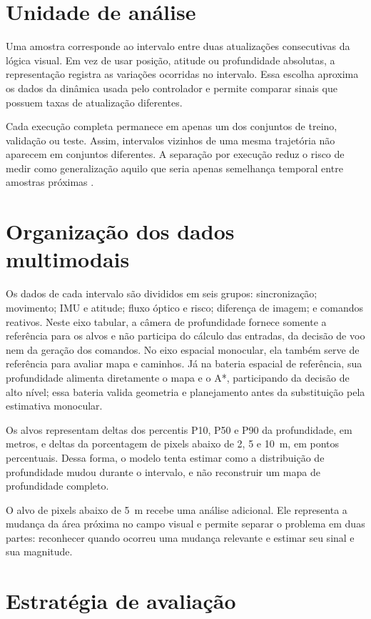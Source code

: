 \section{Unidade de análise}

Uma amostra corresponde ao intervalo entre duas atualizações consecutivas da lógica visual. Em vez de usar posição, atitude ou profundidade absolutas, a representação registra as variações ocorridas no intervalo. Essa escolha aproxima os dados da dinâmica usada pelo controlador e permite comparar sinais que possuem taxas de atualização diferentes.

Cada execução completa permanece em apenas um dos conjuntos de treino, validação ou teste. Assim, intervalos vizinhos de uma mesma trajetória não aparecem em conjuntos diferentes. A separação por execução reduz o risco de medir como generalização aquilo que seria apenas semelhança temporal entre amostras próximas \cite{Kapoor2023}.

\section{Organização dos dados multimodais}

Os dados de cada intervalo são divididos em seis grupos: sincronização; movimento; IMU e atitude; fluxo óptico e risco; diferença de imagem; e comandos reativos. Neste eixo tabular, a câmera de profundidade fornece somente a referência para os alvos e não participa do cálculo das entradas, da decisão de voo nem da geração dos comandos. No eixo espacial monocular, ela também serve de referência para avaliar mapa e caminhos. Já na bateria espacial de referência, sua profundidade alimenta diretamente o mapa e o A*, participando da decisão de alto nível; essa bateria valida geometria e planejamento antes da substituição pela estimativa monocular.

Os alvos representam deltas dos percentis P10, P50 e P90 da profundidade, em metros, e deltas da porcentagem de pixels abaixo de 2, 5 e 10~m, em pontos percentuais. Dessa forma, o modelo tenta estimar como a distribuição de profundidade mudou durante o intervalo, e não reconstruir um mapa de profundidade completo.

O alvo de pixels abaixo de 5~m recebe uma análise adicional. Ele representa a mudança da área próxima no campo visual e permite separar o problema em duas partes: reconhecer quando ocorreu uma mudança relevante e estimar seu sinal e sua magnitude.

\section{Estratégia de avaliação}

